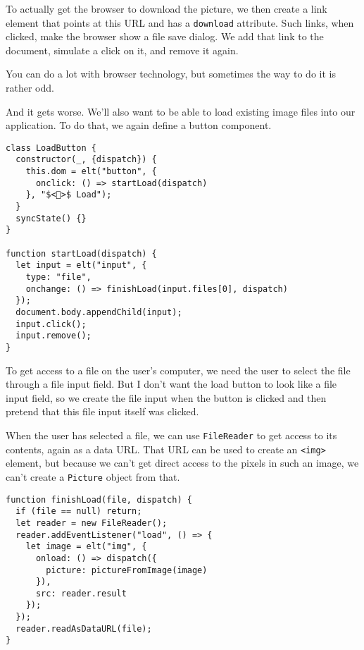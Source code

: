 To actually get the browser to download the picture, we then create a link element that points at this URL and has a \lstinline`download` attribute. Such links, when clicked, make the browser show a file save dialog. We add that link to the document, simulate a click on it, and remove it again.

You can do a lot with browser technology, but sometimes the way to do it is rather odd.

And it gets worse. We'll also want to be able to load existing image files into our application. To do that, we again define a button component.

\begin{lstlisting}
class LoadButton {
  constructor(_, {dispatch}) {
    this.dom = elt("button", {
      onclick: () => startLoad(dispatch)
    }, "$<📁>$ Load");
  }
  syncState() {}
}

function startLoad(dispatch) {
  let input = elt("input", {
    type: "file",
    onchange: () => finishLoad(input.files[0], dispatch)
  });
  document.body.appendChild(input);
  input.click();
  input.remove();
}
\end{lstlisting}
\noindent{}

To get access to a file on the user's computer, we need the user to select the file through a file input field. But I don't want the load button to look like a file input field, so we create the file input when the button is clicked and then pretend that this file input itself was clicked.

When the user has selected a file, we can use \lstinline`FileReader` to get access to its contents, again as a data URL. That URL can be used to create an \lstinline`<img>` element, but because we can't get direct access to the pixels in such an image, we can't create a \lstinline`Picture` object from that.

\begin{lstlisting}
function finishLoad(file, dispatch) {
  if (file == null) return;
  let reader = new FileReader();
  reader.addEventListener("load", () => {
    let image = elt("img", {
      onload: () => dispatch({
        picture: pictureFromImage(image)
      }),
      src: reader.result
    });
  });
  reader.readAsDataURL(file);
}
\end{lstlisting}
\noindent{}

